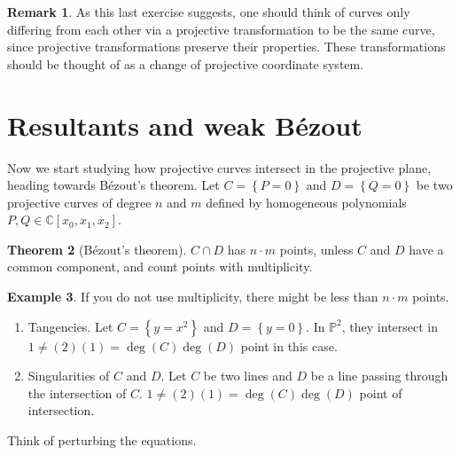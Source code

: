 \documentclass{article}
\newcommand{\C}{\mathbb{C}}
\renewcommand{\P}{\mathbb{P}}
\newcommand{\rb}[1]{\left( #1 \right)}
\renewcommand{\sb}[1]{\left[ #1 \right]}
\newcommand{\cb}[1]{\left\{ #1 \right\}}
\theoremstyle{definition}\newtheorem{definition}{Definition}[section]
\theoremstyle{definition}\newtheorem{notation}[definition]{Notation}
\theoremstyle{definition}\newtheorem{remark}[definition]{Remark}
\theoremstyle{definition}\newtheorem{example}[definition]{Example}
\theoremstyle{definition}\newtheorem{fact}{Fact}
\theoremstyle{definition}\newtheorem{exercise}{Exercise}
\newtheorem{theorem}[definition]{Theorem}
\begin{document}
\begin{remark}
As this last exercise suggests, one should think of curves only differing from each other via a projective transformation to be the same curve, since projective transformations preserve their properties. These transformations should be thought of as a change of projective coordinate system.
\end{remark}


\section{Resultants and weak Bézout}

Now we start studying how projective curves intersect in the projective plane, heading towards Bézout's theorem. Let $ C = \cb{P = 0} $ and $ D = \cb{Q = 0} $ be two projective curves of degree $ n $ and $ m $ defined by homogeneous polynomials $ P, Q \in \C\sb{x_0, x_1, x_2} $.

\begin{theorem}[Bézout's theorem]
$ C \cap D $ has $ n \cdot m $ points, unless $ C $ and $ D $ have a common component, and count points with multiplicity.
\end{theorem}

\begin{example}
If you do not use multiplicity, there might be less than $ n \cdot m $ points.
\begin{enumerate}
\item Tangencies. Let $ C = \cb{y = x^2} $ and $ D = \cb{y = 0} $. In $ \P^2 $, they intersect in $ 1 \ne \rb{2}\rb{1} = \deg\rb{C}\deg\rb{D} $ point in this case.
\item Singularities of $ C $ and $ D $. Let $ C $ be two lines and $ D $ be a line passing through the intersection of $ C $. $ 1 \ne \rb{2}\rb{1} = \deg\rb{C}\deg\rb{D} $ point of intersection.
\end{enumerate}
Think of perturbing the equations.
\end{example}
\end{document}
